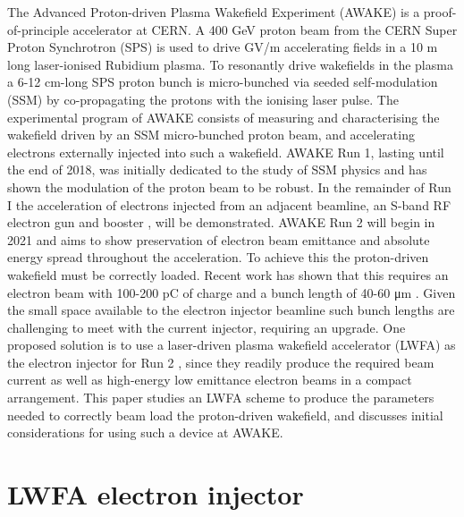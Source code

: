 \documentclass[preprint,5p,times,sort&compress]{elsarticle}
\begin{document}
The Advanced Proton-driven Plasma Wakefield Experiment (AWAKE) \cite{Gschwendtner2016} is a proof-of-principle accelerator at CERN. A 400 GeV proton beam from the CERN Super Proton Synchrotron (SPS) is used to drive GV/m accelerating fields in a 10 m long laser-ionised Rubidium plasma. To resonantly drive wakefields in the plasma a 6-12 cm-long SPS proton bunch is micro-bunched via seeded self-modulation (SSM) \cite{Kumar2010} by co-propagating the protons with the ionising laser pulse. The experimental program of AWAKE consists of measuring and characterising the wakefield driven by an SSM micro-bunched proton beam, and accelerating electrons externally injected into such a wakefield. AWAKE Run 1, lasting until the end of 2018, was initially dedicated to the study of SSM physics and has shown the modulation of the proton beam to be robust. In the remainder of Run I the acceleration of electrons injected from an adjacent beamline, an S-band RF electron gun and booster \cite{Pepitone2016}, will be demonstrated. AWAKE Run 2 will begin in 2021 and aims to show preservation of electron beam emittance and absolute energy spread throughout the acceleration. To achieve this the proton-driven wakefield must be correctly loaded. Recent work has shown that this requires an electron beam with 100-200 pC of charge and a bunch length of 40-60 \si{\micro\meter} \cite{Olsen2018}. Given the small space available to the electron injector beamline such bunch lengths are challenging to meet with the current injector, requiring an upgrade. One proposed solution is to use a laser-driven plasma wakefield accelerator (LWFA) as the electron injector for Run 2  \cite{Muggli2014}, since they readily produce the required beam current as well as high-energy low emittance electron beams in a compact arrangement. This paper studies an LWFA scheme to produce the parameters needed to correctly beam load the proton-driven wakefield, and discusses initial considerations for using such a device at AWAKE.




\section{LWFA electron injector}
\end{document}
